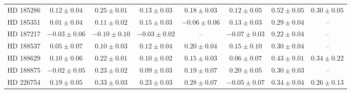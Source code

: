 \begin{table*}
\begin{tabular}{cccccccc}
HD 185286 & $0.12 \pm 0.04$ & $0.25 \pm 0.01$ & $0.13 \pm 0.03$ & $0.18 \pm 0.03$ & $0.12 \pm 0.05$ & $0.52 \pm 0.05$ & $0.30 \pm 0.05$ \\
HD 185351 & $0.01 \pm 0.04$ & $0.11 \pm 0.02$ & $0.15 \pm 0.03$ & $-0.06 \pm 0.06$ & $0.13 \pm 0.03$ & $0.29 \pm 0.04$ & -- \\
HD 187217 & $-0.03 \pm 0.06$ & $-0.10 \pm 0.10$ & $-0.03 \pm 0.02$ & -- & $-0.07 \pm 0.03$ & $0.22 \pm 0.04$ & -- \\
HD 188537 & $0.05 \pm 0.07$ & $0.10 \pm 0.03$ & $0.12 \pm 0.04$ & $0.20 \pm 0.04$ & $0.15 \pm 0.10$ & $0.30 \pm 0.04$ & -- \\
HD 188629 & $0.10 \pm 0.06$ & $0.22 \pm 0.01$ & $0.10 \pm 0.02$ & $0.15 \pm 0.03$ & $0.06 \pm 0.07$ & $0.43 \pm 0.01$ & $0.34 \pm 0.22$ \\
HD 188875 & $-0.02 \pm 0.05$ & $0.23 \pm 0.02$ & $0.09 \pm 0.03$ & $0.19 \pm 0.07$ & $0.20 \pm 0.05$ & $0.30 \pm 0.03$ & -- \\
HD 226754 & $0.19 \pm 0.05$ & $0.33 \pm 0.03$ & $0.23 \pm 0.03$ & $0.28 \pm 0.07$ & $-0.05 \pm 0.07$ & $0.34 \pm 0.04$ & $0.26 \pm 0.13$ \\
\hline
\end{tabular}
\end{table*}
